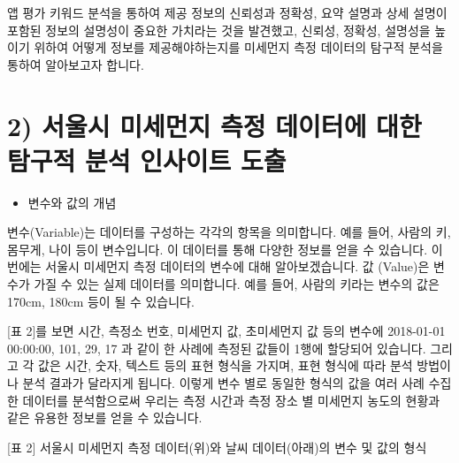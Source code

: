 \documentclass[
  letterpaper,
]{book}
\providecommand{\tightlist}{%
  \setlength{\itemsep}{0pt}\setlength{\parskip}{0pt}}\usepackage{longtable,booktabs,array}
\begin{document}
앱 평가 키워드 분석을 통하여 제공 정보의 신뢰성과 정확성, 요약 설명과
상세 설명이 포함된 정보의 설명성이 중요한 가치라는 것을 발견했고,
신뢰성, 정확성, 설명성을 높이기 위하여 어떻게 정보를 제공해야하는지를
미세먼지 측정 데이터의 탐구적 분석을 통하여 알아보고자 합니다.

\section{2) 서울시 미세먼지 측정 데이터에 대한 탐구적 분석 인사이트
도출}\label{uxc11cuxc6b8uxc2dc-uxbbf8uxc138uxba3cuxc9c0-uxce21uxc815-uxb370uxc774uxd130uxc5d0-uxb300uxd55c-uxd0d0uxad6cuxc801-uxbd84uxc11d-uxc778uxc0acuxc774uxd2b8-uxb3c4uxcd9c}

\begin{itemize}
\tightlist
\item
  변수와 값의 개념
\end{itemize}

변수(Variable)는 데이터를 구성하는 각각의 항목을 의미합니다. 예를 들어,
사람의 키, 몸무게, 나이 등이 변수입니다. 이 데이터를 통해 다양한 정보를
얻을 수 있습니다. 이번에는 서울시 미세먼지 측정 데이터의 변수에 대해
알아보겠습니다. 값 (Value)은 변수가 가질 수 있는 실제 데이터를
의미합니다. 예를 들어, 사람의 키라는 변수의 값은 170cm, 180cm 등이 될 수
있습니다.

{[}표 2{]}를 보면 시간, 측정소 번호, 미세먼지 값, 초미세먼지 값 등의
변수에 2018-01-01 00:00:00, 101, 29, 17 과 같이 한 사례에 측정된 값들이
1행에 할당되어 있습니다. 그리고 각 값은 시간, 숫자, 텍스트 등의 표현
형식을 가지며, 표현 형식에 따라 분석 방법이나 분석 결과가 달라지게
됩니다. 이렇게 변수 별로 동일한 형식의 값을 여러 사례 수집한 데이터를
분석함으로써 우리는 측정 시간과 측정 장소 별 미세먼지 농도의 현황과 같은
유용한 정보를 얻을 수 있습니다.

{[}표 2{]} 서울시 미세먼지 측정 데이터(위)와 날씨 데이터(아래)의 변수 및
값의 형식
\end{document}
